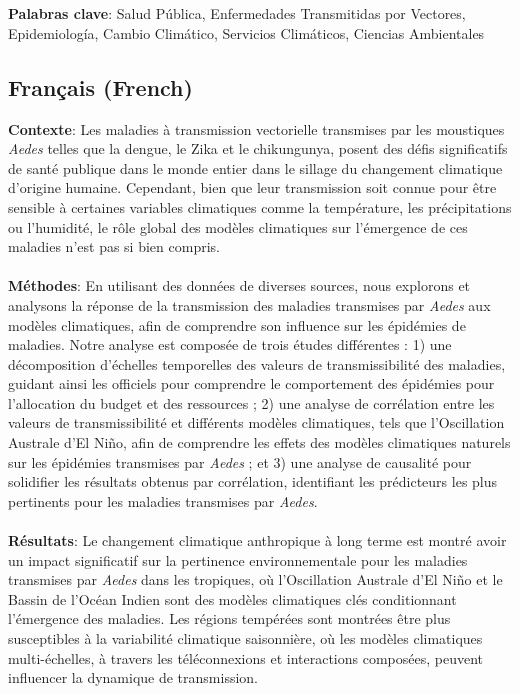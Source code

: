 \documentclass[10pt]{article}
\begin{document}
\\
\\
\textbf{Palabras clave}: Salud Pública, Enfermedades Transmitidas por Vectores, Epidemiología, Cambio Climático, Servicios Climáticos, Ciencias Ambientales

\newpage

\subsection*{Français (French)}

\textbf{Contexte}: Les maladies à transmission vectorielle transmises par les moustiques \textit{Aedes} telles que la dengue, le Zika et le chikungunya, posent des défis significatifs de santé publique dans le monde entier dans le sillage du changement climatique d'origine humaine. Cependant, bien que leur transmission soit connue pour être sensible à certaines variables climatiques comme la température, les précipitations ou l'humidité, le rôle global des modèles climatiques sur l'émergence de ces maladies n'est pas si bien compris.
\\
\\
\textbf{Méthodes}: En utilisant des données de diverses sources, nous explorons et analysons la réponse de la transmission des maladies transmises par \textit{Aedes} aux modèles climatiques, afin de comprendre son influence sur les épidémies de maladies. Notre analyse est composée de trois études différentes : 1) une décomposition d'échelles temporelles des valeurs de transmissibilité des maladies, guidant ainsi les officiels pour comprendre le comportement des épidémies pour l'allocation du budget et des ressources ; 2) une analyse de corrélation entre les valeurs de transmissibilité et différents modèles climatiques, tels que l'Oscillation Australe d'El Niño, afin de comprendre les effets des modèles climatiques naturels sur les épidémies transmises par \textit{Aedes} ; et 3) une analyse de causalité pour solidifier les résultats obtenus par corrélation, identifiant les prédicteurs les plus pertinents pour les maladies transmises par \textit{Aedes}.
\\
\\
\textbf{Résultats}: Le changement climatique anthropique à long terme est montré avoir un impact significatif sur la pertinence environnementale pour les maladies transmises par \textit{Aedes} dans les tropiques, où l'Oscillation Australe d'El Niño et le Bassin de l'Océan Indien sont des modèles climatiques clés conditionnant l'émergence des maladies. Les régions tempérées sont montrées être plus susceptibles à la variabilité climatique saisonnière, où les modèles climatiques multi-échelles, à travers les téléconnexions et interactions composées, peuvent influencer la dynamique de transmission.
\end{document}
